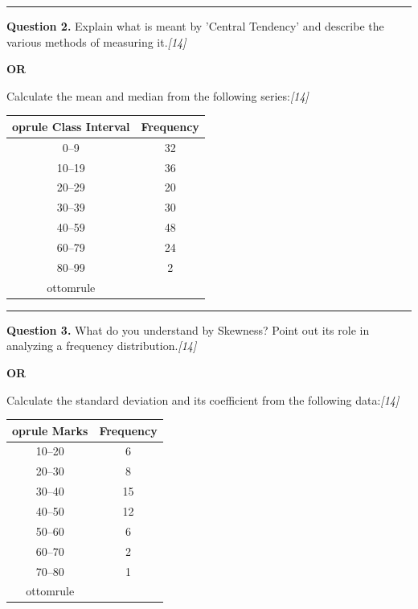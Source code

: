 \documentclass[11pt,a4paper]{article}
\newcommand{\pts}[1]{\hfill   \textit{[#1]}}
\begin{document}
\medskip\rule{\linewidth}{0.2pt}




\noindent   \textbf{Question 2.}
Explain what is meant by 'Central Tendency' and describe the various methods of measuring it.\pts{14}

\centerline{   \textbf{OR}}

Calculate the mean and median from the following series:\pts{14}

\begin{center}
  \small
  
\begin{tabular}{cc}
     oprule
   \textbf{Class Interval} &   \textbf{Frequency} \\
    \midrule
    0--9   & 32 \\
    10--19 & 36 \\
    20--29 & 20 \\
    30--39 & 30 \\
    40--59 & 48 \\
    60--79 & 24 \\
    80--99 & 2  \\
    ottomrule
  \end{tabular}
\end{center}

\medskip\rule{\linewidth}{0.2pt}

\pagebreak




\noindent   \textbf{Question 3.}
What do you understand by Skewness? Point out its role in analyzing a frequency distribution.\pts{14}

\centerline{   \textbf{OR}}

Calculate the standard deviation and its coefficient from the following data:\pts{14}

\begin{center}
  \small
  
\begin{tabular}{cc}
     oprule
   \textbf{Marks} &   \textbf{Frequency} \\
    \midrule
    10--20 & 6  \\
    20--30 & 8  \\
    30--40 & 15 \\
    40--50 & 12 \\
    50--60 & 6  \\
    60--70 & 2  \\
    70--80 & 1  \\
    ottomrule
  \end{tabular}
\end{center}
\end{document}

